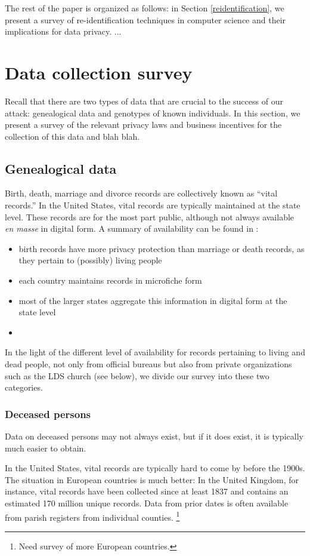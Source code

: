 \documentclass{article}
\begin{document}
The rest of the paper is organized as follows: in Section \ref{reidentification}, we present a survey of re-identification techniques in computer science and their implications for data privacy. ...




\section{Data collection survey}

Recall that there are two types of data that are crucial to the success of our attack: genealogical data and  genotypes of known individuals. In this section, we present a survey of the relevant privacy laws and business incentives for the collection of this data and blah blah.


\subsection{Genealogical data}
Birth, death, marriage  and divorce records are collectively known as ``vital records.'' In the United States, vital records are typically maintained at the state level. These records are for the most part public, although not always available {\em en masse} in digital form. A summary of availability can be found in \cite{messing}:
\begin{itemize}
\item
birth records have more privacy protection than marriage or death records, as they pertain to (possibly) living people
\item
each country maintains records in microfiche form
\item
most of the larger states aggregate this information in digital form at the state level
\item
\end{itemize}

In the light of the different level of availability for records pertaining to living and dead people, not only from official bureaus but also from private organizations such as the LDS church (see below), we divide our survey into these two categories.

\subsubsection{Deceased persons}
Data on deceased persons may not always exist, but if it does exist, it is typically much easier to obtain.

In the United States, vital records are typically hard to come by before the 1900s. The situation in European countries is much better: In the United Kingdom, for instance, vital records have been collected since at least 1837 \cite{ukbmd.org.uk} and contains an estimated 170 million unique records. Data from prior dates is often available from parish registers from individual counties. \footnote{Need survey of more European countries.} 
\end{document}
